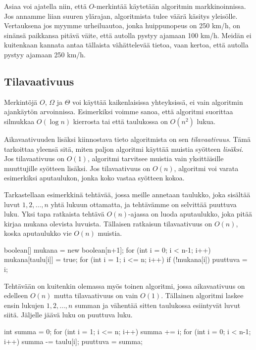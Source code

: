 Asiaa voi ajatella niin, että $O$-merkintää käytetään algoritmin
markkinoinnissa. Jos annamme liian suuren ylärajan, algoritmista
tulee väärä käsitys yleisölle.
Vertauksena jos myymme urheiluautoa, jonka huippunopeus on 250 km/h,
on sinänsä paikkansa pitävä väite, että autolla pystyy ajamaan 100 km/h.
Meidän ei kuitenkaan kannata antaa tällaista vähättelevää tietoa,
vaan kertoa, että autolla pystyy ajamaan 250 km/h.

\subsection{Tilavaativuus}

Merkintöjä $O$, $\Omega$ ja $\Theta$ voi käyttää
kaikenlaisissa yhteyksissä, ei vain algoritmin ajankäytön arvoinnissa.
Esimerkiksi voimme sanoa, että algoritmi suorittaa silmukkaa $O(\log n)$ kierrosta
tai että taulukossa on $O(n^2)$ lukua.

Aikavaativuuden lisäksi kiinnostava tieto algoritmista on sen
\emph{tilavaativuus}. Tämä tarkoittaa yleensä sitä, miten paljon algoritmi
käyttää muistia syötteen \emph{lisäksi}.
Jos tilavaativuus on $O(1)$, algoritmi tarvitsee muistia
vain yksittäisille muuttujille syötteen lisäksi.
Jos tilavaativuus on $O(n)$, algoritmi voi varata esimerkiksi aputaulukon,
jonka koko vastaa syötteen kokoa.

Tarkastellaan esimerkkinä tehtävää, jossa meille annetaan taulukko,
joka sisältää luvut $1,2,\dots,n$ yhtä lukuun ottamatta,
ja tehtävämme on selvittää puuttuva luku.
Yksi tapa ratkaista tehtävä $O(n)$-ajassa on luoda aputaulukko,
joka pitää kirjaa mukana olevista luvuista.
Tällaisen ratkaisun tilavaativuus on $O(n)$,
koska aputaulukko vie $O(n)$ muistia.

\begin{code}
boolean[] mukana = new boolean[n+1];
for (int i = 0; i < n-1; i++) {
    mukana[taulu[i]] = true;
}
for (int i = 1; i <= n; i++) {
    if (!mukana[i]) puuttuva = i;
}
\end{code}

Tehtävään on kuitenkin olemassa myös toinen algoritmi,
jossa aikavaativuus on edelleen $O(n)$ mutta tilavaativuus on vain $O(1)$.
Tällainen algoritmi laskee ensin lukujen $1,2,\dots,n$ summan
ja vähentää sitten taulukossa esiintyvät luvut siitä.
Jäljelle jäävä luku on puuttuva luku.

\begin{code}
int summa = 0;
for (int i = 1; i <= n; i++) {
    summa += i;
}
for (int i = 0; i < n-1; i++) {
    summa -= taulu[i];
}
puuttuva = summa;
\end{code}

